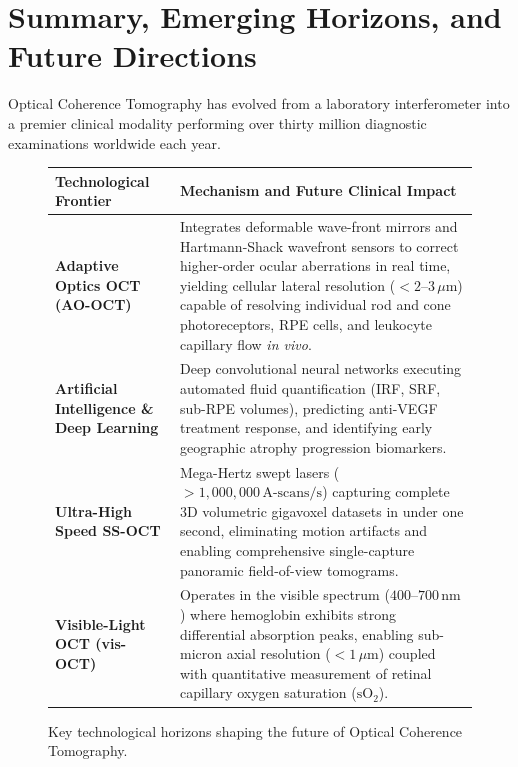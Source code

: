 \documentclass[11pt,a4paper]{article}
\begin{document}
\section{Summary, Emerging Horizons, and Future Directions}

Optical Coherence Tomography has evolved from a laboratory interferometer into a premier clinical modality performing over thirty million diagnostic examinations worldwide each year.

\begin{figure}[htbp]
\centering
\setlength{\tabcolsep}{4pt}
\begin{tabular}{p{4.2cm}p{10.5cm}}
\toprule
\textbf{Technological Frontier} & \textbf{Mechanism and Future Clinical Impact} \\
\midrule
\textbf{Adaptive Optics OCT (AO-OCT)} & Integrates deformable wave-front mirrors and Hartmann-Shack wavefront sensors to correct higher-order ocular aberrations in real time, yielding cellular lateral resolution ($< 2\text{--}3\,\mu\text{m}$) capable of resolving individual rod and cone photoreceptors, RPE cells, and leukocyte capillary flow \textit{in vivo}. \\
\addlinespace
\textbf{Artificial Intelligence \& Deep Learning} & Deep convolutional neural networks executing automated fluid quantification (IRF, SRF, sub-RPE volumes), predicting anti-VEGF treatment response, and identifying early geographic atrophy progression biomarkers. \\
\addlinespace
\textbf{Ultra-High Speed SS-OCT} & Mega-Hertz swept lasers ($> 1{,}000{,}000\,\text{A-scans/s}$) capturing complete $3\text{D}$ volumetric gigavoxel datasets in under one second, eliminating motion artifacts and enabling comprehensive single-capture panoramic field-of-view tomograms. \\
\addlinespace
\textbf{Visible-Light OCT (vis-OCT)} & Operates in the visible spectrum ($400\text{--}700\,\text{nm}$) where hemoglobin exhibits strong differential absorption peaks, enabling sub-micron axial resolution ($< 1\,\mu\text{m}$) coupled with quantitative measurement of retinal capillary oxygen saturation ($\text{sO}_2$). \\
\bottomrule
\end{tabular}
\caption{Key technological horizons shaping the future of Optical Coherence Tomography.}
\label{tab:future_horizons}
\end{figure}
\end{document}
